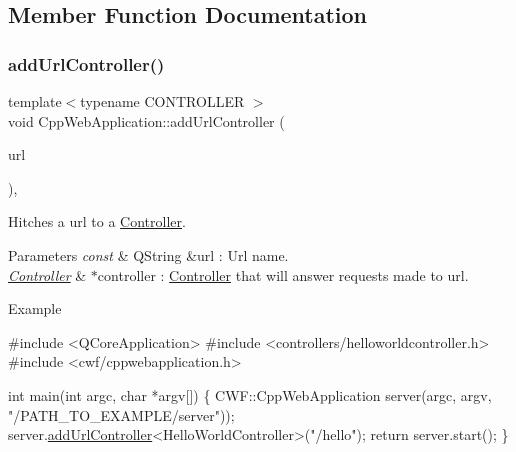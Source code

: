 \subsection{Member Function Documentation}
\mbox{\label{class_cpp_web_application_a57657865223a43795ce755e77d7b8f27}} 
\subsubsection{\texorpdfstring{add\+Url\+Controller()}{addUrlController()}}
{\footnotesize\ttfamily template$<$typename C\+O\+N\+T\+R\+O\+L\+L\+ER $>$ \\
void Cpp\+Web\+Application\+::add\+Url\+Controller (\begin{DoxyParamCaption}\item[{const Q\+String \&}]{url }\end{DoxyParamCaption})\hspace{0.3cm}{\ttfamily [inline]}, {\ttfamily [noexcept]}}



Hitches a url to a \hyperlink{class_controller}{Controller}. 


\begin{DoxyParams}{Parameters}
{\em const} & Q\+String \&url \+: Url name. \\
\hline
{\em \hyperlink{class_controller}{Controller}} & $\ast$controller \+: \hyperlink{class_controller}{Controller} that will answer requests made to url. \\
\hline
\end{DoxyParams}
\begin{DoxyParagraph}{Example}

\begin{DoxyCode}
\textcolor{preprocessor}{#include <QCoreApplication>}
\textcolor{preprocessor}{#include <controllers/helloworldcontroller.h>}
\textcolor{preprocessor}{#include <cwf/cppwebapplication.h>}

\textcolor{keywordtype}{int} main(\textcolor{keywordtype}{int} argc, \textcolor{keywordtype}{char} *argv[])
\{
     CWF::CppWebApplication server(argc, argv, \textcolor{stringliteral}{"/PATH\_TO\_EXAMPLE/server"}));
     server.\hyperlink{class_cpp_web_server_ab876ae8eb6d14b89b9f0a76739c1545d}{addUrlController}<HelloWorldController>(\textcolor{stringliteral}{"/hello"});
     \textcolor{keywordflow}{return} server.start();
\}
\end{DoxyCode}
 
\end{DoxyParagraph}
\mbox{\label{class_cpp_web_application_a1e9f2c789934748d6b7c29ad33e9d7c9}} 
